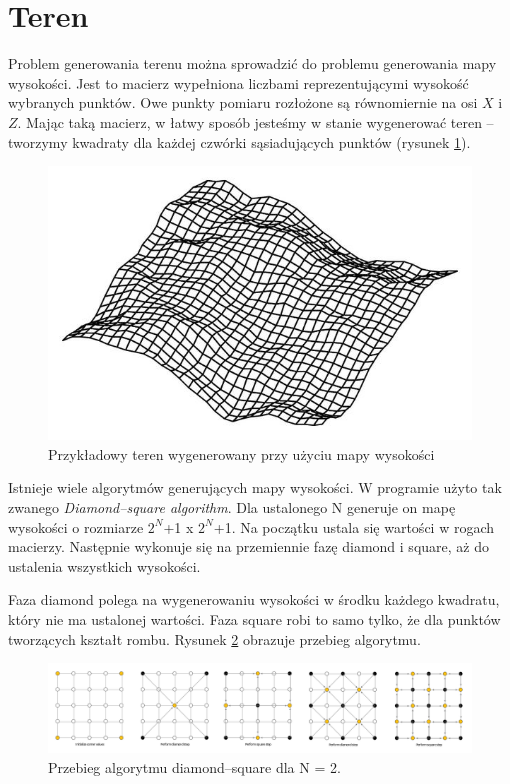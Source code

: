 \documentclass[inz,shortabstract]{iithesis}
\begin{document}
    \section{Teren}
        Problem generowania terenu można sprowadzić do problemu generowania mapy wysokości. Jest to macierz wypełniona liczbami reprezentującymi wysokość wybranych punktów. Owe punkty pomiaru rozłożone są równomiernie na osi $X$ i $Z$. Mając taką macierz, w łatwy sposób jesteśmy w stanie wygenerować teren -- tworzymy kwadraty dla każdej czwórki sąsiadujących punktów (rysunek \ref{fig:heightmap}). 
        \begin{figure}[H]
            \includegraphics[width=\linewidth]{heightmap.png}
            \caption{Przykładowy teren wygenerowany przy użyciu mapy wysokości \cite{heightmap}} 
            \label{fig:heightmap}
        \end{figure}
        
        Istnieje wiele algorytmów generujących mapy wysokości. W programie użyto tak zwanego \textit{Diamond--square algorithm}. Dla ustalonego N generuje on mapę wysokości o rozmiarze $2^N$+1 x $2^N$+1. Na początku ustala się wartości w rogach macierzy. Następnie wykonuje się na przemiennie fazę diamond i square, aż do ustalenia wszystkich wysokości. 
        
        Faza diamond polega na wygenerowaniu wysokości w środku każdego kwadratu, który nie ma ustalonej wartości. Faza square robi to samo tylko, że dla punktów tworzących kształt rombu. Rysunek \ref{fig:diamondSquare} obrazuje przebieg algorytmu. 
        \begin{figure}[H]
            \includegraphics[width=\linewidth]{diamondSquare.png}
            \caption{Przebieg algorytmu diamond--square dla N = 2.} 
            \label{fig:diamondSquare}
        \end{figure}
        
\end{document}
